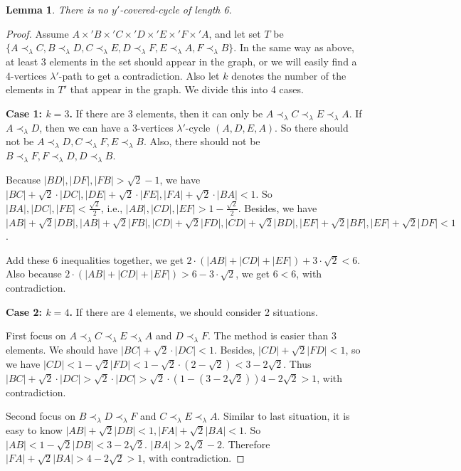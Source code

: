\documentclass[11pt]{article}
\newtheorem{lemma}[theorem]{Lemma}
\theoremstyle{remark}
\begin{document}
\begin{lemma}
There is no $y'$-covered-cycle of length 6.
\end{lemma}

\begin{proof}
Assume $A\times' B\times' C\times' D\times' E\times' F\times' A$, and let set $T$ be $\{A\prec_{\lambda}C,B\prec_{\lambda}D,C\prec_{\lambda}E,D\prec_{\lambda}F,E\prec_{\lambda}A,F\prec_{\lambda}B\}$.
In the same way as above, at least 3 elements in the set should appear in the graph, or we will easily find a 4-vertices $\lambda'$-path to get a contradiction. Also let $k$ denotes the number of the elements in $T'$ that appear in the graph. We divide this into 4 cases.

\noindent\textbf{Case 1: $k=3$.}
If there are 3 elements, then it can only be $A\prec_{\lambda}C\prec_{\lambda}E\prec_{\lambda}A$.
If $A\prec_{\lambda}D$, then we can have a 3-vertices $\lambda'$-cycle $(A,D,E,A)$. So there should not be $A\prec_{\lambda}D,C\prec_{\lambda}F,E\prec_{\lambda}B$. Also, there should not be $B\prec_{\lambda}F,F\prec_{\lambda}D,D\prec_{\lambda}B$.

Because $|BD|,|DF|,|FB|>\sqrt2-1$, we have $|BC|+\sqrt2\cdot |DC|, |DE|+\sqrt2\cdot |FE|, |FA|+\sqrt2\cdot |BA|<1$. So $|BA|,|DC|,|FE|<\frac{\sqrt2}{2}$, i.e., $|AB|,|CD|,|EF|>1-\frac{\sqrt2}{2}$. Besides, we have $|AB|+\sqrt2|DB|,|AB|+\sqrt2|FB|,|CD|+\sqrt2|FD|,|CD|+\sqrt2|BD|,|EF|+\sqrt2|BF|,|EF|+\sqrt2|DF|<1$.

Add these 6 inequalities together, we get $2\cdot (|AB|+|CD|+|EF|)+3\cdot \sqrt2 < 6$. Also because $2\cdot(|AB|+|CD|+|EF|)>6-3\cdot \sqrt2$, we get $6<6$, with contradiction.

\noindent\textbf{Case 2: $k=4$.}
If there are 4 elements, we should consider 2 situations.

First focus on $A\prec_{\lambda}C\prec_{\lambda}E\prec_{\lambda}A$ and $D\prec_{\lambda}F$.
The method is easier than 3 elements. We should have $|BC|+\sqrt2\cdot |DC|<1$. Besides, $|CD|+\sqrt2|FD|<1$, so we have $|CD|<1-\sqrt2|FD|<1-\sqrt2 \cdot (2-\sqrt2)<3-2\sqrt2$. Thus $|BC|+\sqrt2\cdot |DC|>\sqrt2\cdot |DC|>\sqrt2\cdot(1-(3-2\sqrt2))4-2\sqrt2>1$, with contradiction.

Second focus on $B\prec_{\lambda}D\prec_{\lambda}F$ and $C\prec_{\lambda}E\prec_{\lambda}A$.
Similar to last situation, it is easy to know $|AB|+\sqrt2|DB|<1, |FA|+\sqrt2|BA|<1$. So $|AB|<1-\sqrt2|DB|<3-2\sqrt2$. $|BA|>2\sqrt2-2$. Therefore $|FA|+\sqrt2|BA|>4-2\sqrt2>1$, with contradiction.


\end{proof}
\end{document}
